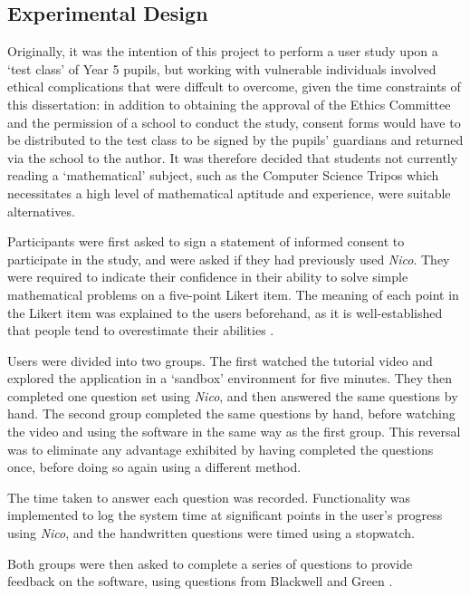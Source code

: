 \documentclass[12pt,twoside,notitlepage,xetex]{report}
\begin{document}
{\subsection{Experimental Design}

Originally, it was the intention of this project to perform a user study upon a `test class' of Year 5 pupils, but working with vulnerable individuals involved ethical complications that were diffcult to overcome, given the time constraints of this dissertation: in addition to obtaining the approval of the Ethics Committee and the permission of a school to conduct the study, consent forms would have to be distributed to the test class to be signed by the pupils' guardians and returned via the school to the author.  It was therefore decided that students not currently reading a `mathematical' subject, such as the Computer Science Tripos which necessitates a high level of mathematical aptitude and experience, were suitable alternatives.

Participants were first asked to sign a statement of informed consent to participate in the study, and were asked if they had previously used \emph{Nico}. They were required to indicate their confidence in their ability to solve simple mathematical problems on a five-point Likert item.  The meaning of each point in the Likert item was explained to the users beforehand, as it is well-established that people tend to overestimate their abilities \cite{Mura1987}.

Users were divided into two groups.  The first watched the tutorial video and explored the application in a `sandbox' environment for five minutes.  They then completed one question set using \emph{Nico}, and then answered the same questions by hand.  The second group completed the same questions by hand, before watching the video and using the software in the same way as the first group.  This reversal was to eliminate any advantage exhibited by having completed the questions once, before doing so again using a different method.

The time taken to answer each question was recorded.  Functionality was implemented to log the system time at significant points in the user's progress using \emph{Nico}, and the handwritten questions were timed using a stopwatch.

Both groups were then asked to complete a series of questions to provide feedback on the software, using questions from Blackwell and Green \cite{Blackwell2000}.

}
\end{document}
